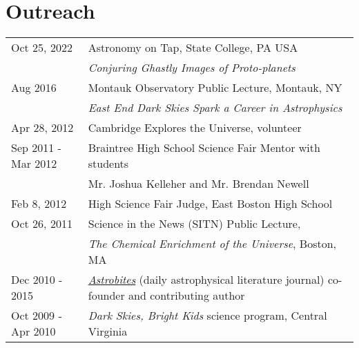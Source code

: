 \section*{Outreach}
\begin{tabular*}{\textwidth}{@{\hspace{10pt}}p{1.4in}l}
Oct 25, 2022 & Astronomy on Tap, State College, PA USA\\
  & \emph{Conjuring Ghastly Images of Proto-planets}\\[\rowskip]
Aug 2016 & Montauk Observatory Public Lecture, Montauk, NY \\
&  \emph{East End Dark Skies Spark a Career in Astrophysics}\\
Apr 28, 2012 & Cambridge Explores the Universe, volunteer\\
Sep 2011 - Mar 2012 & Braintree High School Science Fair Mentor with students\\
& Mr. Joshua Kelleher and Mr. Brendan Newell\\
Feb 8, 2012 & High Science Fair Judge, East Boston High School\\
Oct 26, 2011 & Science in the News (SITN) Public Lecture,\\
& \emph{The Chemical Enrichment of the Universe}, Boston, MA\\
Dec 2010 - 2015 & \href{http://astrobites.com/}{\emph{Astrobites}} (daily astrophysical literature journal) co-founder and contributing author\\
Oct 2009 - Apr 2010 & \emph{Dark Skies, Bright Kids} science program, Central Virginia\\
\end{tabular*}